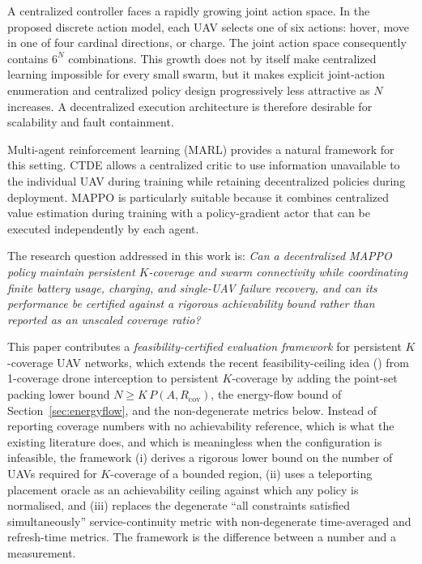 \documentclass[conference]{IEEEtran}
\begin{document}
A centralized controller faces a rapidly growing joint action space. In the proposed discrete action model, each UAV selects one of six actions: hover, move in one of four cardinal directions, or charge. The joint action space consequently contains $6^N$ combinations. This growth does not by itself make centralized learning impossible for every small swarm, but it makes explicit joint-action enumeration and centralized policy design progressively less attractive as $N$ increases. A decentralized execution architecture is therefore desirable for scalability and fault containment.

Multi-agent reinforcement learning (MARL) provides a natural framework for this setting. CTDE allows a centralized critic to use information unavailable to the individual UAV during training while retaining decentralized policies during deployment. MAPPO is particularly suitable because it combines centralized value estimation during training with a policy-gradient actor that can be executed independently by each agent.

The research question addressed in this work is: \emph{Can a decentralized MAPPO policy maintain persistent $K$-coverage and swarm connectivity while coordinating finite battery usage, charging, and single-UAV failure recovery, and can its performance be certified against a rigorous achievability bound rather than reported as an unscaled coverage ratio?}

This paper contributes a \emph{feasibility-certified evaluation framework} for persistent $K$-coverage UAV networks, which extends the recent feasibility-ceiling idea (\cite{ceilings2026}) from 1-coverage drone interception to persistent $K$-coverage by adding the point-set packing lower bound $N \ge K\,P(A,R_{\mathrm{cov}})$, the energy-flow bound of Section~\ref{sec:energyflow}, and the non-degenerate metrics below.  Instead of reporting coverage numbers with no achievability reference, which is what the existing literature does, and which is meaningless when the configuration is infeasible, the framework (i) derives a rigorous lower bound on the number of UAVs required for $K$-coverage of a bounded region, (ii) uses a teleporting placement oracle as an achievability ceiling against which any policy is normalised, and (iii) replaces the degenerate ``all constraints satisfied simultaneously'' service-continuity metric with non-degenerate time-averaged and refresh-time metrics.  The framework is the difference between a number and a measurement.
\end{document}
